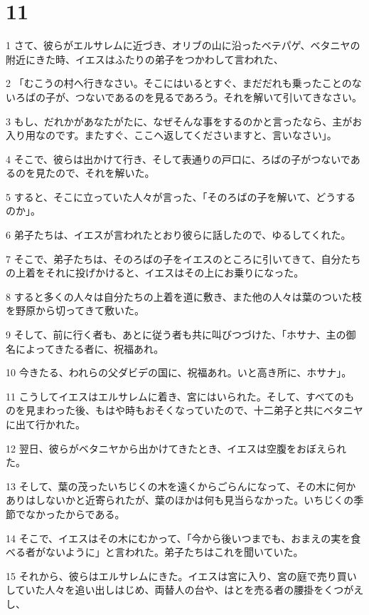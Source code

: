 \chapter{11}

\par 1 さて、彼らがエルサレムに近づき、オリブの山に沿ったベテパゲ、ベタニヤの附近にきた時、イエスはふたりの弟子をつかわして言われた、
\par 2 「むこうの村へ行きなさい。そこにはいるとすぐ、まだだれも乗ったことのないろばの子が、つないであるのを見るであろう。それを解いて引いてきなさい。
\par 3 もし、だれかがあなたがたに、なぜそんな事をするのかと言ったなら、主がお入り用なのです。またすぐ、ここへ返してくださいますと、言いなさい」。
\par 4 そこで、彼らは出かけて行き、そして表通りの戸口に、ろばの子がつないであるのを見たので、それを解いた。
\par 5 すると、そこに立っていた人々が言った、「そのろばの子を解いて、どうするのか」。
\par 6 弟子たちは、イエスが言われたとおり彼らに話したので、ゆるしてくれた。
\par 7 そこで、弟子たちは、そのろばの子をイエスのところに引いてきて、自分たちの上着をそれに投げかけると、イエスはその上にお乗りになった。
\par 8 すると多くの人々は自分たちの上着を道に敷き、また他の人々は葉のついた枝を野原から切ってきて敷いた。
\par 9 そして、前に行く者も、あとに従う者も共に叫びつづけた、「ホサナ、主の御名によってきたる者に、祝福あれ。
\par 10 今きたる、われらの父ダビデの国に、祝福あれ。いと高き所に、ホサナ」。
\par 11 こうしてイエスはエルサレムに着き、宮にはいられた。そして、すべてのものを見まわった後、もはや時もおそくなっていたので、十二弟子と共にベタニヤに出て行かれた。
\par 12 翌日、彼らがベタニヤから出かけてきたとき、イエスは空腹をおぼえられた。
\par 13 そして、葉の茂ったいちじくの木を遠くからごらんになって、その木に何かありはしないかと近寄られたが、葉のほかは何も見当らなかった。いちじくの季節でなかったからである。
\par 14 そこで、イエスはその木にむかって、「今から後いつまでも、おまえの実を食べる者がないように」と言われた。弟子たちはこれを聞いていた。
\par 15 それから、彼らはエルサレムにきた。イエスは宮に入り、宮の庭で売り買いしていた人々を追い出しはじめ、両替人の台や、はとを売る者の腰掛をくつがえし、

